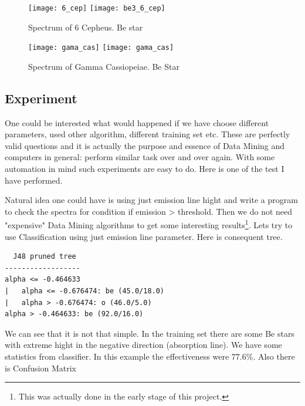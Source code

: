    \begin{figure}[!htbp]
      \begin{center}
        \leavevmode
        \ifpdf
        \texttt{[image: 6\_cep]}
        \else
        \texttt{[image: be3\_6\_cep]}
        \fi
        \caption{Spectrum of 6 Cepheus. Be star}
        \label{FigBe3}
      \end{center}
    \end{figure}

  \begin{figure}[!htbp]
      \begin{center} 
        \leavevmode
        \ifpdf
        \texttt{[image: gama\_cas]}
        \else
        \texttt{[image: gama\_cas]}
        \fi     
        \caption{Spectrum of Gamma Cassiopeiae. Be Star}
        \label{FigBe3}
      \end{center}
    \end{figure}




\subsection{Experiment}

One could be interested what would happened if we have choose
different parameters, used other algorithm, different training set
etc. These are perfectly valid questions and it is actually the purpose
and essence of Data Mining and computers in general: perform similar
task over and over again. With some automation in mind such
experiments are easy to do. Here is one of the test I have performed.

Natural idea one could have is using just emission line hight and
write a program to check the spectra for condition \textrm{if emission
  > threshold}. Then we do not need "expensive" Data Mining algorithms to
get some interesting results\footnote{This was actually done in the early
stage of this project.}. Lets try to use Classification using just
emission line parameter. Here is consequent tree.


\begin{lstlisting}
  J48 pruned tree
------------------
alpha <= -0.464633
|   alpha <= -0.676474: be (45.0/18.0)
|   alpha > -0.676474: o (46.0/5.0)
alpha > -0.464633: be (92.0/16.0)
\end{lstlisting}

We can see that it is not that simple. In the training set there are
some Be stars with extreme hight in the negative direction (absorption
line). We have some statistics from classifier. In this example
the effectiveness were $77.6$\%. Also there is Confusion Matrix 

